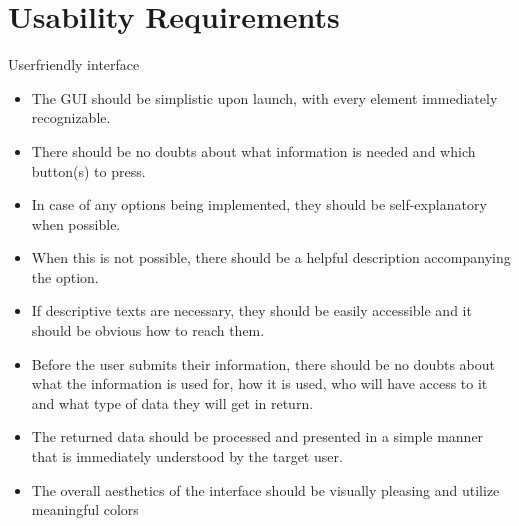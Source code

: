 \section{Usability Requirements}
\begin{requirement}{Userfriendly interface} 
\begin{itemize}
  \item The \ac{GUI} should be simplistic upon launch, with every element
  immediately recognizable.
  \item There should be no doubts about what information is needed and which button(s) to press.
  \item In case of any options being implemented, they should be self-explanatory when possible.
  \item When this is not possible, there should be a helpful description
  accompanying the option.
  \item If descriptive texts are necessary, they should be easily accessible and
  it should be obvious how to reach them.
  \item Before the user submits their information, there should be no doubts
  about what the information is used for, how it is used, who will have access to it and what type of data they will get in return.
  \item The returned data should be processed and presented in a simple manner that is immediately understood by the
        target user.
  \item The overall aesthetics of the interface should be visually pleasing and
  utilize meaningful colors
\end{itemize}
\end{requirement}